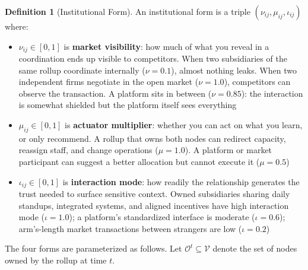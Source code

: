 \documentclass[12pt]{article}
\theoremstyle{definition}
\newtheorem{definition}{Definition}
\begin{document}
\begin{definition}[Institutional Form]
An institutional form is a triple $(\nu_{ij}, \mu_{ij}, \iota_{ij})$ where:
\begin{itemize}
\item $\nu_{ij} \in [0,1]$ is \textbf{market visibility}: how much of what you reveal in a coordination ends up visible to competitors. When two subsidiaries of the same rollup coordinate internally ($\nu = 0.1$), almost nothing leaks. When two independent firms negotiate in the open market ($\nu = 1.0$), competitors can observe the transaction. A platform sits in between ($\nu = 0.85$): the interaction is somewhat shielded but the platform itself sees everything
\item $\mu_{ij} \in [0,1]$ is \textbf{actuator multiplier}: whether you can act on what you learn, or only recommend. A rollup that owns both nodes can redirect capacity, reassign staff, and change operations ($\mu = 1.0$). A platform or market participant can suggest a better allocation but cannot execute it ($\mu = 0.5$)
\item $\iota_{ij} \in [0,1]$ is \textbf{interaction mode}: how readily the relationship generates the trust needed to surface sensitive context. Owned subsidiaries sharing daily standups, integrated systems, and aligned incentives have high interaction mode ($\iota = 1.0$); a platform's standardized interface is moderate ($\iota = 0.6$); arm's-length market transactions between strangers are low ($\iota = 0.2$)
\end{itemize}
\end{definition}

The four forms are parameterized as follows. Let $\mathcal{O}^t \subseteq \mathcal{V}$ denote the set of nodes owned by the rollup at time $t$.
\end{document}
